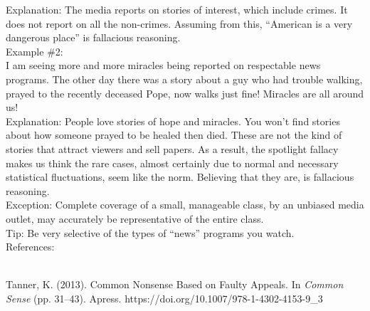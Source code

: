 \documentclass[a4paper,12pt,single,pdftex]{scrartcl}
\begin{document}
    
      Explanation: The media reports on stories of interest, which include crimes.  It does not report on all the non-crimes.  Assuming from this, “American is a very dangerous place” is fallacious reasoning.
    \\

    
      Example \#2:
    \\

    
      I am seeing more and more miracles being reported on respectable news programs.  The other day there was a story about a guy who had trouble walking, prayed to the recently deceased Pope, now walks just fine!  Miracles are all around us!
    \\

    
      Explanation: People love stories of hope and miracles.  You won’t find stories about how someone prayed to be healed then died.  These are not the kind of stories that attract viewers and sell papers.  As a result, the spotlight fallacy makes us think the rare cases, almost certainly due to normal and necessary statistical fluctuations, seem like the norm.  Believing that they are, is fallacious reasoning.
    \\

    
      Exception: Complete coverage of a small, manageable class, by an unbiased media outlet, may accurately be representative of the entire class.
    \\

    
      Tip: Be very selective of the types of “news” programs you watch.
    \\

    References:

    
      
        
      \\

      
        
          Tanner, K. (2013). Common Nonsense Based on Faulty Appeals. In {\it Common Sense} (pp. 31–43). Apress. https://doi.org/10.1007/978-1-4302-4153-9\_3
        
      
    
\end{document}
